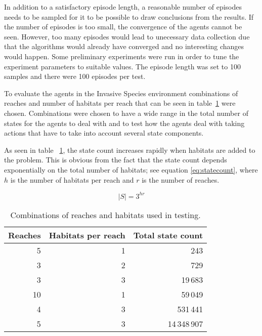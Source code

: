 In addition to a satisfactory episode length, a reasonable number of episodes
needs to be sampled for it to be possible to draw conclusions from the results.
If the number of episodes is too small, the convergence of the agents cannot be
seen. However, too many episodes would lead to unecessary data collection due
that the algorithms would already have converged and no interesting changes
would happen. Some preliminary experiments were run in order to tune the
experiment parameters to suitable values. The episode length was set to 100
samples and there were 100 episodes per test.

To evaluate the agents in the Invasive Species environment combinations of
reaches and number of habitats per reach that can be seen in
table~\ref{tab:reaches_habitats} were chosen. Combinations were chosen to have
a wide range in the total number of states for the agents to deal with and to
test how the agents deal with taking actions that have to take into account
several state components. 

As seen in table ~\ref{tab:reaches_habitats}, the state count increases rapidly
when habitats are added to the problem. This is obvious from the fact that the
state count depends exponentially on the total number of habitats; see equation
\eqref{eq:statecount}, where $h$ is the number of habitats per reach and $r$ is
the number of reaches.

\begin{equation}
\label{eq:statecount}
 |S| = 3 ^ {hr}
\end{equation}

\begin{table}[H]
\centering
\caption{Combinations of reaches and habitats used in testing.}
\label{tab:reaches_habitats}
\begin{tabular}{rrr}
 \toprule
 Reaches & Habitats per reach & Total state count \\
 \midrule
 5  & 1 &          243 \\
 3  & 2 &          729 \\
 3  & 3 &      19\,683 \\
 10 & 1 &      59\,049 \\
 4  & 3 &     531\,441 \\
 5  & 3 & 14\,348\,907 \\
 \bottomrule
\end{tabular}
\end{table}
